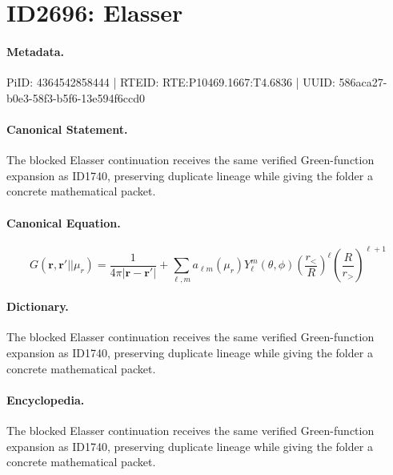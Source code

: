 \section*{ID2696: Elasser}
\paragraph{Metadata.}
PiID: 4364542858444 | RTEID: RTE:P10469.1667:T4.6836 | UUID: 586aca27-b0e3-58f3-b5f6-13e594f6ccd0

\paragraph{Canonical Statement.}
The blocked Elasser continuation receives the same verified Green-function expansion as ID1740, preserving duplicate lineage while giving the folder a concrete mathematical packet.

\paragraph{Canonical Equation.}
\[
G(\mathbf r,\mathbf r' || \mu_r)=\frac{1}{4\pi\lvert\mathbf r-\mathbf r'\rvert}+\sum_{\ell,m}a_{\ell m}(\mu_r)Y_{\ell}^{m}(\theta,\phi)\left(\frac{r_{<}}{R}\right)^{\ell}\left(\frac{R}{r_{>}}\right)^{\ell+1}
\]

\paragraph{Dictionary.}
The blocked Elasser continuation receives the same verified Green-function expansion as ID1740, preserving duplicate lineage while giving the folder a concrete mathematical packet.

\paragraph{Encyclopedia.}
The blocked Elasser continuation receives the same verified Green-function expansion as ID1740, preserving duplicate lineage while giving the folder a concrete mathematical packet.
